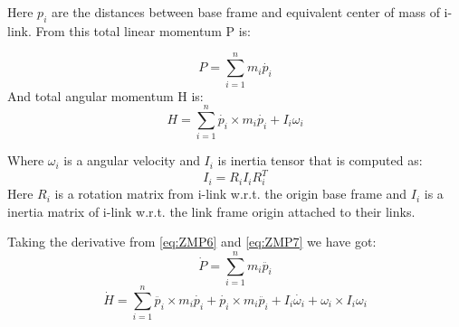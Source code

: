 \documentclass[12pt,a4paper]{report}
\begin{document}
		Here $p_i$ are the distances between base frame and equivalent center of mass of i-link. From this total linear momentum P is:
	
		\begin{equation} \label{eq:ZMP6}
			P = \sum^n_{i=1}{m_i \dot{p_i}}
		\end{equation}
		And total angular momentum H is:
		\begin{equation} \label{eq:ZMP7}
			H = \sum^n_{i=1}{\dot{p_i} \times m_i \dot{p_i} + I_i \omega_i}
		\end{equation}

		Where $\omega_i$ is a angular velocity and $I_i$ is inertia tensor that is computed as:
		\begin{equation} \label{eq:ZMP8}
			I_i = R_i I_i R_i^T
		\end{equation}
		Here $R_i$ is a rotation matrix from i-link w.r.t. the origin base frame and $I_i$ is a inertia matrix of i-link w.r.t. the link frame origin attached to their links.

		Taking the derivative from \ref{eq:ZMP6} and \ref{eq:ZMP7} we have got:
		\begin{equation} \label{eq:ZMP9}
			\dot{P} = \sum^n_{i=1}{m_i \ddot{p_i}}
		\end{equation}
		\begin{equation} \label{eq:ZMP10}
			\dot{H} = \sum^n_{i=1}{\ddot{p_i} \times m_i \dot{p_i} + \dot{p_i} \times m_i \ddot{p_i} + I_i \dot{\omega_i}} + \omega_i \times I_i \omega_i
		\end{equation}
\end{document}
